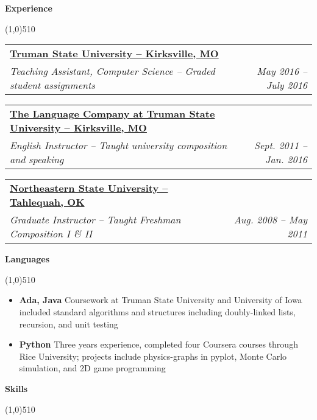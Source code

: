 \documentclass[letterpaper,11pt]{article}
\makeatletter
\newcommand{\resheading}[1]{{\large {\begin{minipage}{\textwidth}{\textbf{#1 \vphantom{p\^{E}}}}\end{minipage}}}}
\newcommand{\ressubheading}[4]{
\begin{tabular*}{6.5in}{l@{\extracolsep{\fill}}r}
		\textbf{#1} & #2 \\
		\textit{#3} & \textit{#4} \\
\end{tabular*}\vspace{-6pt}}
\makeatother
\begin{document}




\resheading{Experience}

\line(1,0){510}
	\begin{description}
	
			\item 
			\ressubheading{\href{http://www.truman.edu}{Truman State University -- Kirksville, MO }}{}
				{Teaching Assistant, Computer Science -- Graded student assignments}{ \footnotesize{May 2016 -- July 2016}}


		\item 
			\ressubheading{\href{http://www.thelanguagecompany.com}{The Language Company at Truman State University -- Kirksville, MO}}{}
				{English Instructor -- Taught university composition and speaking}{ \footnotesize{Sept. 2011 -- Jan. 2016}}

		\item
			\ressubheading{\href{http://www.nsuok.edu}{Northeastern State University -- Tahlequah, OK}}{}
				{Graduate Instructor -- Taught Freshman Composition I \& II}{ \footnotesize{Aug. 2008 -- May 2011}}


	\end{description}  %



\resheading{Languages}

\line(1,0){510}


		
		\begin{itemize}
		    \item \textbf{Ada, Java} Coursework at Truman State University and University of Iowa included standard algorithms and structures including doubly-linked lists, recursion, and unit testing
		    \item \textbf{Python} Three years experience, completed four Coursera courses through Rice University; projects include physics-graphs in pyplot, Monte Carlo simulation, and 2D game programming 
		\end{itemize}
		
	
\resheading{Skills}

\line(1,0){510}
\end{document}
